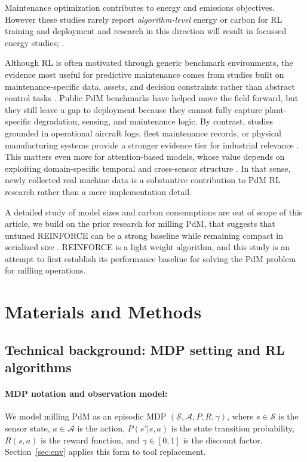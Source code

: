 \documentclass[sn-basic]{sn-jnl}%
\begin{document}
Maintenance optimization contributes to energy and emissions objectives. However these studies rarely report \emph{algorithm-level} energy or carbon for RL training and deployment and research in this direction will result in focussed energy studies; \cite{Banyai2021, Banyai2022, JasiulewiczKaczmarek2024}. 

Although RL is often motivated through generic benchmark environments, the evidence most useful for predictive maintenance comes from studies built on maintenance-specific data, assets, and decision constraints rather than abstract control tasks \cite{Andrade2021Aircraft,Dangut2022RareFailure,Zhao2024,Siraskar2025}. Public PdM benchmarks have helped move the field forward, but they still leave a gap to deployment because they cannot fully capture plant-specific degradation, sensing, and maintenance logic. By contrast, studies grounded in operational aircraft logs, fleet maintenance records, or physical manufacturing systems provide a stronger evidence tier for industrial relevance \cite{Andrade2021Aircraft,Dangut2022RareFailure,Chen2024DigitalTwin}. This matters even more for attention-based models, whose value depends on exploiting domain-specific temporal and cross-sensor structure \cite{Zhao2024}. In that sense, newly collected real machine data is a substantive contribution to PdM RL research rather than a mere implementation detail.

A detailed study of model sizes and carbon consumptions are out of scope of this article, we build on the prior research for milling PdM, that suggests that untuned \textsc{REINFORCE} can be a strong baseline while remaining compact in serialized size \cite{Siraskar2025}. \textsc{REINFORCE} is a light weight algorithm, and this study is an attempt to first establish its performance baseline for solving the PdM problem for milling operations.

\section{Materials and Methods}\label{sec:method}

\subsection{Technical background: MDP setting and RL algorithms}\label{sec:tech_background}
\paragraph{MDP notation and observation model:}
We model milling PdM as an episodic MDP $(\mathcal{S},\mathcal{A},P,R,\gamma)$, where $s \in \mathcal{S}$ is the sensor state, $a \in \mathcal{A}$ is the action, $P(s'|s,a)$ is the state transition probability, $R(s,a)$ is the reward function, and $\gamma \in [0,1]$ is the discount factor. Section~\ref{sec:env} applies this form to tool replacement.
\end{document}
